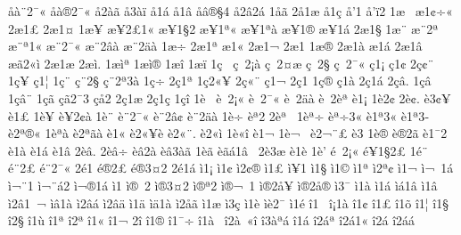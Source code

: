 {^^e5^^e0^^a82^^af^^ab
^^e5^^e0^^ae2^^af^^ab
^^e52^^e0^^e3
^^e53^^e0^^ef
^^e51^^e1
^^e51^^e2
^^e5^^e2^^ae^^a74
^^e52^^e22^^e1
1^^e5^^e3
2^^e51^^e6
^^e51^^e7
^^e5'1
^^e5'^^ef2
1^^e6^^a0
^^e61^^a2^^f7^^ab
2^^e61^^a3
2^^e61^^a4
1^^e6^^a5
^^e6^^a52^^a31^^ab
^^e6^^a51^^a72
^^e6^^a51^^aa^^ab
^^e6^^a51^^aa^^e0
^^e6^^a51^^ae
^^e6^^a51^^e1
2^^e61^^a7
1^^e6^^a8
^^e6^^a82^^aa
^^e6^^a8^^aa1^^ab
^^e6^^a82^^af^^ab
^^e6^^a82^^e2^^e0
^^e6^^a82^^e4^^e0
1^^e6^^f7
2^^e61^^aa
^^e61^^ab
2^^e61^^ac
2^^e61^^ad
1^^e6^^ae
2^^e61^^e0
^^e61^^e1
2^^e61^^e2
^^e6^^e32^^ab^^ec
2^^e61^^e6
2^^e6^^ec.
1^^e6^^ec^^aa
1^^e6^^ec^^ae
1^^e6^^ee
1^^e6^^ef
1^^e7^^a0
^^e7^^a02^^a1^^e0
^^e7^^a02^^a4^^e6
^^e7^^a02^^a7
^^e7^^a02^^af^^ab
^^e71^^a1
^^e71^^a2
2^^e7^^a2^^a8
1^^e7^^a5
^^e71^^a6
1^^e7^^a8
^^e7^^a82^^a7
^^e7^^a82^^aa3^^e0
1^^e7^^f7
2^^e71^^aa
1^^e72^^ab^^a5
2^^e7^^ab^^a8
^^e71^^ac
2^^e71^^ad
1^^e7^^ae
^^e71^^e0
2^^e71^^e1
2^^e7^^e2.
1^^e7^^e2^^a0
1^^e7^^e2^^a8
1^^e7^^e3
^^e7^^e32^^af3
^^e7^^e52
2^^e71^^e6
2^^e71^^e7
1^^e7^^ee
1^^e8^^a0
^^e8^^a02^^a1^^ab
^^e8^^a02^^af^^ab
^^e8^^a02^^e4^^e0
^^e8^^a02^^e8^^aa
^^e81^^a1
1^^e82^^a2
2^^e8^^a2.
^^e83^^a2^^a5
^^e81^^a3
1^^e8^^a5
^^e8^^a52^^a2^^e0
1^^e8^^a8
^^e8^^a82^^af^^ab
^^e8^^a82^^e2^^a2
^^e8^^a82^^e4^^e0
1^^e8^^f7
^^e8^^aa2
2^^e8^^aa^^a0
1^^e8^^aa^^f7
^^e8^^aa^^f73^^ab
^^e81^^aa3^^ab
^^e81^^aa3^^ad
^^e82^^aa^^ae^^ab
1^^e8^^aa^^e0
^^e82^^aa^^e3^^e0
^^e81^^ab
^^e82^^ab^^a5^^e8
^^e82^^ab^^a8.
^^e82^^ab^^ec
1^^e8^^ab^^ee
^^e81^^ac
1^^e8^^ac^^a0
^^e82^^ac^^a8^^a3
^^e83^^ad
1^^e8^^ae
^^e8^^ae2^^e3
^^e81^^af2
^^e81^^e0
^^e81^^e1
^^e81^^e2
2^^e8^^e2.
2^^e8^^e2^^f7
^^e8^^e22^^e0
^^e8^^e23^^e0^^e3
1^^e8^^e3
^^e8^^e3^^e11^^e2^^a0
2^^e83^^e6
^^e81^^e8
1^^e8'
^^e9^^a02^^a1^^ab
^^e9^^a51^^a72^^a3
1^^e9^^a8
^^e9^^a82^^a3
^^e9^^a82^^af^^ab
2^^e91^^ad
^^e9^^ae2^^a3
^^e9^^ae3^^a42
2^^e91^^e1
^^ec1^^a1
^^ec1^^a2
^^ec2^^a2^^ae
^^ec1^^a3
^^ec^^a51
^^ec1^^a7
^^ec1^^a9
^^ec1^^aa
^^ec2^^aa^^a2
^^ec1^^ac
^^ec^^ac^^a01^^e1
^^ec^^ac^^a81
^^ec^^ac^^a8^^e12
^^ec^^ac^^ae1^^e1
^^ec1^^ad
^^ec^^ae^^a02
^^ec^^ae3^^a42
^^ec^^ae^^aa2
^^ec^^ae^^ac^^a01
^^ec^^ae2^^e5^^a5
^^ec^^ae2^^e5^^ae
^^ec3^^af
^^ec1^^e0
^^ec1^^e1
^^ec^^e11^^e2
^^ec1^^e2
^^ec2^^e21^^a0^^ac
^^ec^^e21^^e0
^^ec2^^e2^^e1
^^ec2^^e2^^e4
^^ec1^^e4
^^ec^^e41^^e0
^^ec2^^e5^^e3
^^ec1^^e6
^^ec3^^e7
^^ec1^^e8
^^ec^^e82^^af
^^ec1^^e9
^^ee1^^a0
^^ee^^a11^^e0
^^ee1^^a2
^^ee1^^a3
^^ee1^^f5
^^ee1^^a6
^^ee1^^a7
^^ee2^^a7^^ad
^^ee1^^f9
^^ee1^^aa
^^ee2^^aa^^ad
^^ee1^^ab
^^ee1^^ac
2^^ee^^ad
^^ee1^^ae
^^ee1^^af^^f7
^^ee1^^e0^^a0
^^ee2^^e0^^a0^^ab^^ee
^^ee3^^e0^^aa^^e1
^^ee1^^e1
^^ee2^^e1^^aa
^^ee2^^e11^^ab
^^ee2^^e1^^ad
^^ee2^^e1^^e1
}
